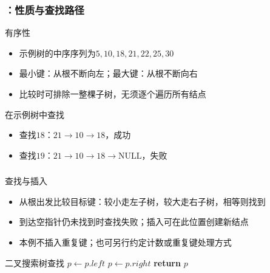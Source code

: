 \begin{frame}
    \frametitle{\insertsectionhead：性质与查找路径}
    \begin{block}{有序性}
        \begin{itemize}
            \item 示例树的中序序列为$5,10,18,21,22,25,30$
            \item 最小键：从根不断向左；最大键：从根不断向右
            \item 比较时可排除一整棵子树，无须逐个遍历所有结点
        \end{itemize}
    \end{block}
    \begin{exampleblock}{在示例树中查找}
        \begin{itemize}
            \item 查找$18$：$21\rightarrow10\rightarrow18$，成功
            \item 查找$19$：$21\rightarrow10\rightarrow18\rightarrow\mathrm{NULL}$，失败
        \end{itemize}
    \end{exampleblock}
\end{frame}

\begin{fragile}
    \frametitle{\insertsectionhead}
    \begin{block}{查找与插入}
        \begin{itemize}
            \item 从根出发比较目标键：较小走左子树，较大走右子树，相等则找到
            \item 到达空指针仍未找到时查找失败；插入可在此位置创建新结点
            \item 本例不插入重复键；也可另行约定计数或重复键处理方式
        \end{itemize}
    \end{block}
    \begin{algorithmx}{二叉搜索树查找}
        \State $p\gets p.left$
        \Else
        \State $p\gets p.right$
        \EndIf
        \EndWhile
        \State \textbf{return} $p$
        \EndProcedure
    \end{algorithmx}
\end{fragile}

